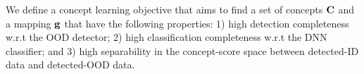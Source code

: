 %
%


We define a concept learning objective that aims to find a set of concepts $\mathbf{C}$ and a mapping $\mathbf{g}$ that have the following properties: 1) high detection completeness w.r.t the OOD detector; 2) high classification completeness w.r.t the DNN classifier; and 3) high separability in the concept-score space between detected-ID data and detected-OOD data.

